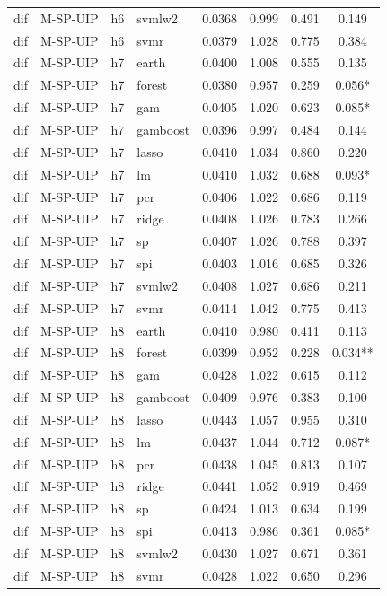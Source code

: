 \begin{ThreePartTable}
\begin{longtable}[t]{llclcccc}
dif & M-SP-UIP & h6 & svmlw2 & 0.0368 & 0.999 & 0.491 & 0.149\\
dif & M-SP-UIP & h6 & svmr & 0.0379 & 1.028 & 0.775 & 0.384\\
\addlinespace
dif & M-SP-UIP & h7 & earth & 0.0400 & 1.008 & 0.555 & 0.135\\
dif & M-SP-UIP & h7 & forest & 0.0380 & 0.957 & 0.259 & 0.056*\\
dif & M-SP-UIP & h7 & gam & 0.0405 & 1.020 & 0.623 & 0.085*\\
dif & M-SP-UIP & h7 & gamboost & 0.0396 & 0.997 & 0.484 & 0.144\\
dif & M-SP-UIP & h7 & lasso & 0.0410 & 1.034 & 0.860 & 0.220\\
dif & M-SP-UIP & h7 & lm & 0.0410 & 1.032 & 0.688 & 0.093*\\
dif & M-SP-UIP & h7 & pcr & 0.0406 & 1.022 & 0.686 & 0.119\\
dif & M-SP-UIP & h7 & ridge & 0.0408 & 1.026 & 0.783 & 0.266\\
dif & M-SP-UIP & h7 & sp & 0.0407 & 1.026 & 0.788 & 0.397\\
dif & M-SP-UIP & h7 & spi & 0.0403 & 1.016 & 0.685 & 0.326\\
dif & M-SP-UIP & h7 & svmlw2 & 0.0408 & 1.027 & 0.686 & 0.211\\
dif & M-SP-UIP & h7 & svmr & 0.0414 & 1.042 & 0.775 & 0.413\\
\addlinespace
dif & M-SP-UIP & h8 & earth & 0.0410 & 0.980 & 0.411 & 0.113\\
dif & M-SP-UIP & h8 & forest & 0.0399 & 0.952 & 0.228 & 0.034**\\
dif & M-SP-UIP & h8 & gam & 0.0428 & 1.022 & 0.615 & 0.112\\
dif & M-SP-UIP & h8 & gamboost & 0.0409 & 0.976 & 0.383 & 0.100\\
dif & M-SP-UIP & h8 & lasso & 0.0443 & 1.057 & 0.955 & 0.310\\
dif & M-SP-UIP & h8 & lm & 0.0437 & 1.044 & 0.712 & 0.087*\\
dif & M-SP-UIP & h8 & pcr & 0.0438 & 1.045 & 0.813 & 0.107\\
dif & M-SP-UIP & h8 & ridge & 0.0441 & 1.052 & 0.919 & 0.469\\
dif & M-SP-UIP & h8 & sp & 0.0424 & 1.013 & 0.634 & 0.199\\
dif & M-SP-UIP & h8 & spi & 0.0413 & 0.986 & 0.361 & 0.085*\\
dif & M-SP-UIP & h8 & svmlw2 & 0.0430 & 1.027 & 0.671 & 0.361\\
dif & M-SP-UIP & h8 & svmr & 0.0428 & 1.022 & 0.650 & 0.296\\

\end{longtable}
\end{ThreePartTable}
